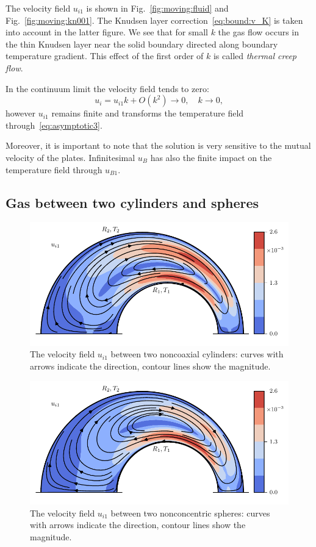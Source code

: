\documentclass[smallextended, referee]{svjour3} %
\begin{document}
The velocity field \(u_{i1}\) is shown in Fig.~\ref{fig:moving:fluid} and Fig.~\ref{fig:moving:kn001}.
The Knudsen layer correction~\eqref{eq:bound:v_K} is taken into account in the latter figure.
We see that for small \(k\) the gas flow occurs in the thin Knudsen layer near the solid boundary
directed along boundary temperature gradient.
This effect of the first order of \(k\) is called \textit{thermal creep flow}.

In the continuum limit the velocity field tends to zero:
\[ u_i = u_{i1}k + O(k^2) \to 0, \quad k\to0, \]
however \(u_{i1}\) remains finite and transforms the temperature field through~\eqref{eq:asymptotic3}.

Moreover, it is important to note that the solution is very sensitive to the mutual velocity of the plates.
Infinitesimal \(u_B\) has also the finite impact on the temperature field through \(u_{B1}\).

\subsection{Gas between two cylinders and spheres}

\begin{figure}
	\centering
	\includegraphics{Fig7}
	\caption{The velocity field \(u_{i1}\) between two noncoaxial cylinders:
		curves with arrows indicate the direction, contour lines show the magnitude.}
	\label{fig:cylinders}
\end{figure}

\begin{figure}
	\centering
	\includegraphics{Fig8}
	\caption{The velocity field \(u_{i1}\) between two nonconcentric spheres:
		curves with arrows indicate the direction, contour lines show the magnitude.}
	\label{fig:spheres}
\end{figure}
\end{document}
